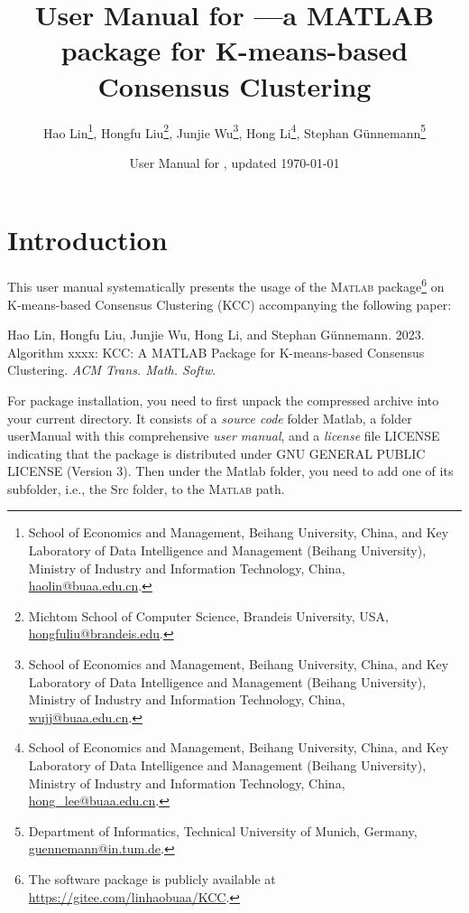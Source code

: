 \documentclass[10pt]{acmtrans2e}
\title{User Manual for \package{KCC}---a {MATLAB} package for K-means-based Consensus Clustering}
\author{
Hao Lin\footnote{School of Economics and Management, Beihang University, China, and Key Laboratory of Data Intelligence and Management (Beihang University), Ministry of Industry and Information Technology, China, \textsf{\href{mailto:haolin@buaa.edu.cn}{haolin@buaa.edu.cn}}.}, \quad
Hongfu Liu\footnote{Michtom School of Computer Science, Brandeis University, USA, \textsf{\href{mailto:hongfuliu@brandeis.edu}{hongfuliu@brandeis.edu}}.}, \quad
Junjie Wu\footnote{School of Economics and Management, Beihang University, China, and Key Laboratory of Data Intelligence and Management (Beihang University), Ministry of Industry and Information Technology, China, \textsf{\href{mailto:wujj@buaa.edu.cn}{wujj@buaa.edu.cn}}.}, \quad
Hong Li\footnote{School of Economics and Management, Beihang University, China, and Key Laboratory of Data Intelligence and Management (Beihang University), Ministry of Industry and Information Technology, China, \textsf{\href{mailto:hong_lee@buaa.edu.cn}{hong\_lee@buaa.edu.cn}}.}, \quad
Stephan Günnemann\footnote{Department of Informatics, Technical University of Munich, Germany, \textsf{\href{mailto:guennemann@in.tum.de}{guennemann@in.tum.de}}.}
}
\date{User Manual for \package{KCC}, updated \today}
\newcommand{\Matlab}{\textsc{Matlab}}
\begin{document}
\maketitle

\vspace*{-0.5cm}

\section{Introduction}

This user manual systematically presents the usage of the \Matlab{} package\footnote{The software package is publicly available at \url{https://gitee.com/linhaobuaa/KCC}.} on K-means-based Consensus Clustering (KCC) accompanying the following paper:
\begin{center}
\begin{minipage}{0.90\textwidth}
Hao Lin, Hongfu Liu, Junjie Wu, Hong Li, and Stephan Günnemann. 2023. Algorithm xxxx: KCC: A MATLAB Package for K-means-based Consensus Clustering. \emph{ACM Trans. Math. Softw}.
\end{minipage}
\end{center}

\noindent For package installation, you need to first unpack the compressed archive into your current directory. It consists of a \emph{source code} folder \textsf{Matlab}, a folder \textsf{userManual} with this comprehensive \emph{user manual}, and a \emph{license} file \textsf{LICENSE} indicating that the package is distributed under GNU GENERAL PUBLIC LICENSE (Version 3). Then under the \textsf{Matlab} folder, you need to add one of its subfolder, i.e., the \textsf{Src} folder, to the \Matlab{} path. 
\end{document}
